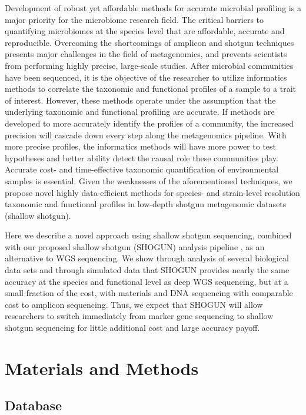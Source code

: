 \documentclass[conference,11pt]{IEEEtran}
\begin{document}
Development of robust yet affordable methods for accurate microbial profiling is a major priority for the microbiome research field. The critical barriers to quantifying microbiomes at the species level that are affordable, accurate and reproducible. Overcoming the shortcomings of amplicon and shotgun techniques presents major challenges in the field of metagenomics, and prevents scientists from performing highly precise, large-scale studies. After microbial communities have been sequenced, it is the objective of the researcher to utilize informatics methods to correlate the taxonomic and functional profiles of a sample to a trait of interest. However, these methods operate under the assumption that the underlying taxonomic and functional profiling are accurate. If methods are developed to more accurately identify the profiles of a community, the increased precision will cascade down every step along the metagenomics pipeline. With more precise profiles, the informatics methods will have more power to test hypotheses and better ability detect the causal role these communities play. Accurate cost- and time-effective taxonomic quantification of environmental samples is essential. Given the weaknesses of the aforementioned techniques, we propose novel highly data-efficient methods for species- and strain-level resolution taxonomic and functional profiles in low-depth shotgun metagenomic datasets (shallow shotgun).

Here we describe a novel approach using shallow shotgun sequencing, combined with our proposed shallow shotgun (SHOGUN) analysis pipeline \cite{benjamin_hillmann_knights-lab/shogun:_2017}, as an alternative to WGS sequencing. We show through analysis of several biological data sets and through simulated data that SHOGUN provides nearly the same accuracy at the species and functional level as deep WGS sequencing, but at a small fraction of the cost, with materials and DNA sequencing with comparable cost to amplicon sequencing. Thus, we expect that SHOGUN will allow researchers to switch immediately from marker gene sequencing to shallow shotgun sequencing for little additional cost and large accuracy payoff.

\section{Materials and Methods}


\subsection{Database}
\end{document}
